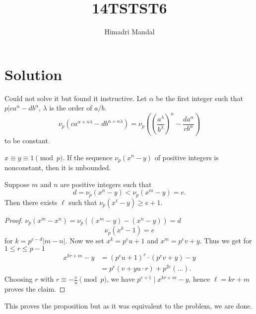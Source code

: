 \documentclass[11pt]{scrartcl}
\title{14TSTST6}
\author{Himadri Mandal}
\begin{document}
\maketitle

\section{Solution}

\raggedright
\begin{soln}
  Could not solve it but found it instructive. Let $\alpha$ be the first integer such that $p|ca^\alpha - db^\alpha$, $\lambda$ is the order of $a/b$.
\[ \nu_p \left( c a^{\alpha + n\lambda} - d b^{\alpha + n \lambda} \right)
	= \nu_p \left(
		\left( \frac{a^\lambda}{b^\lambda} \right)^n
		- \frac{d a^\alpha}{c b^{\alpha}} \right)
\]
to be constant.
\begin{proposition*}
	$x \equiv y \equiv 1 \pmod p$.
	If the sequence $\nu_p\left( x^n - y \right)$ of positive integers
	is nonconstant, then it is unbounded.
\end{proposition*}

\begin{claim*}
	Suppose $m$ and $n$ are positive integers such that
	\[ d = \nu_p(x^n-y) < \nu_p(x^m-y) = e. \]
	Then there exists $\ell$ such that $\nu_p(x^\ell - y) \ge e + 1$.
\end{claim*}
\begin{proof}
$\nu_p(x^m - x^n) = \nu_p\left( (x^m-y) - (x^n-y) \right) = d$
\[ \nu_p(x^k-1) = e \]
for $k = p^{e-d}|m-n|$.
Now we set $x^k = p^e u + 1$ and $x^m = p^e v + y$. Thus we get for $1 \le r \le p-1$
\begin{align*}
	x^{kr+m}-y &= (p^e u + 1)^r \cdot (p^e v + y) - y \\
	&= p^e \left( v + yu \cdot r \right) + p^{2e} \left( \dots \right).
\end{align*}
  Choosing $r$ with $r \equiv -\frac{v}{u} \pmod p$,
we have $p^{e+1} \mid x^{kr+m} - y$,
hence $\ell = kr+m$ proves the claim.
\end{proof}

This proves the proposition but as it was equivalent to the problem, we are done.
\end{soln}
\end{document}
